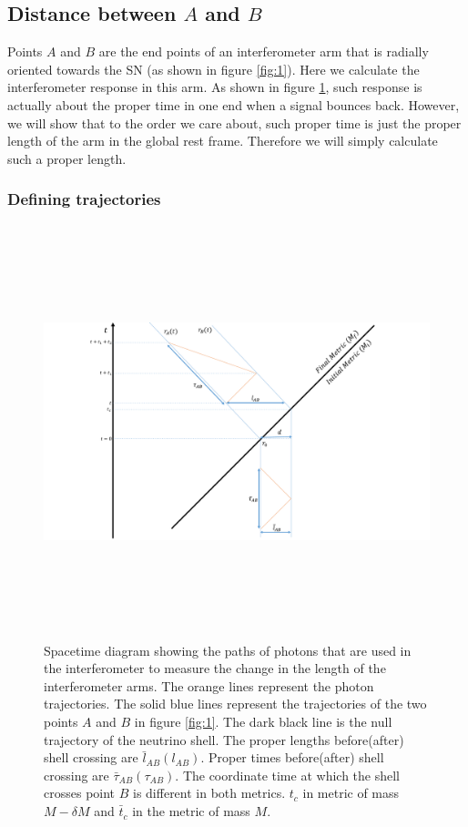 \documentclass[aps,showpacs,onecolumn,floats,prd,superscriptaddress,nofootinbib]{revtex4-1}
\begin{document}
\subsection{Distance between $A$ and $B$}

Points $A$ and $B$ are the end points of an interferometer arm that is radially oriented towards the SN (as shown in figure \ref{fig:1}). 
Here we calculate the interferometer response in this arm.
As shown in figure \ref{calculation}, such response is actually about the proper time in one end when a signal bounces back.
However, we will show that to the order we care about, such proper time is just the proper length of the arm in the global rest frame.
Therefore we will simply calculate such a proper length.

\subsubsection{Defining trajectories}

\begin{figure}[tb!]
\begin{center}
\includegraphics[width =\textwidth, height = 12cm]{calculation.pdf}
\caption{Spacetime diagram showing the paths of photons that are used in the interferometer to measure the change in the length of the interferometer arms. The orange lines represent the photon trajectories. The solid blue lines represent the trajectories of the two points $A$ and $B$ in figure \ref{fig:1}. The dark black line is the null trajectory of the neutrino shell. The proper lengths before(after) shell crossing are $\bar{l}_{AB}(l_{AB})$. Proper times before(after) shell crossing are $\bar{\tau}_{AB}(\tau_{AB})$. The coordinate time at which the shell crosses point $B$ is different in both metrics. $t_c$ in metric of mass $M-\delta M$ and $\bar{t}_c$ in the metric of mass $M$. }
\label{calculation}
\end{center}
\end{figure}
\end{document}
